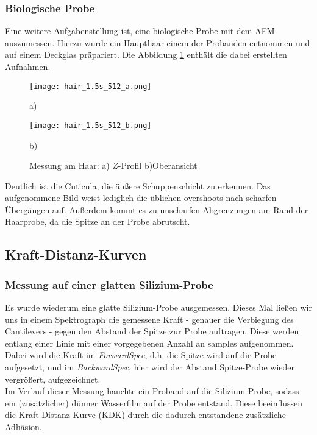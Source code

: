 \subsubsection{Biologische Probe}
Eine weitere Aufgabenstellung ist, eine biologische Probe mit dem AFM auszumessen. Hierzu wurde ein Haupthaar einem der Probanden entnommen und auf einem Deckglas präpariert. Die Abbildung \ref{fig:hair} enthält die dabei erstellten Aufnahmen.
\begin{figure}[h]
	\begin{minipage}{0.45\textwidth}
		\texttt{[image: hair\_1.5s\_512\_a.png]}
		\caption{a)}
	\end{minipage}
	\hfill
	\begin{minipage}{0.45\textwidth}
		\texttt{[image: hair\_1.5s\_512\_b.png]}
		\caption{b)}
	\end{minipage}
	\caption{Messung am Haar: a) $Z$-Profil b)Oberansicht}
	\label{fig:hair}
\end{figure}
Deutlich ist die Cuticula, die äußere Schuppenschicht zu erkennen. Das aufgenommene Bild weist lediglich die üblichen overshoots nach scharfen Übergängen auf. Außerdem kommt es zu unscharfen Abgrenzungen am Rand der Haarprobe, da die Spitze an der Probe abrutscht.
\subsection{Kraft-Distanz-Kurven}
\subsubsection{Messung auf einer glatten Silizium-Probe}
Es wurde wiederum eine glatte Silizium-Probe ausgemessen. Dieses Mal ließen wir uns in einem Spektrograph die gemessene Kraft - genauer die Verbiegung des Cantilevers - gegen den Abstand der Spitze zur Probe auftragen. Diese werden entlang einer Linie mit einer vorgegebenen Anzahl an samples aufgenommen.\\
Dabei wird die Kraft im \emph{ForwardSpec}, d.h. die Spitze wird auf die Probe aufgesetzt, und im \emph{BackwardSpec}, hier wird der Abstand Spitze-Probe wieder vergrößert, aufgezeichnet.\\
Im Verlauf dieser Messung hauchte ein Proband auf die Silizium-Probe, sodass ein (zusätzlicher) dünner Wasserfilm auf der Probe entstand. Diese beeinflussen die Kraft-Distanz-Kurve (KDK) durch die dadurch entstandene zusätzliche Adhäsion.

